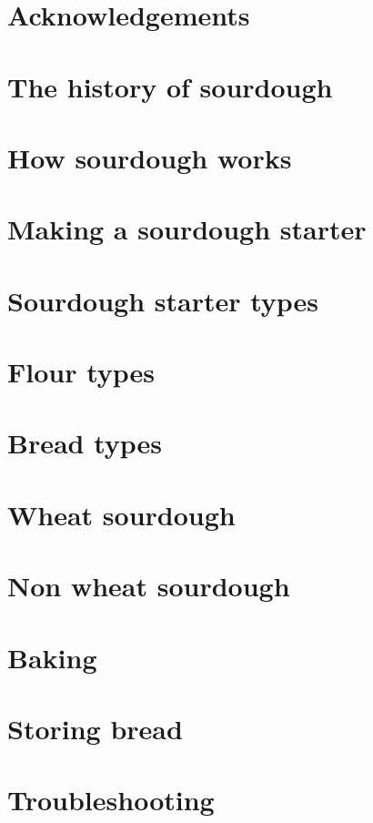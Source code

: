 \documentclass[a4paper, 12pt]{book}
\begin{document}
\chapter{Acknowledgements}



\mainmatter

\chapter{The history of sourdough}


\chapter{How sourdough works}


\chapter{Making a sourdough starter}


\chapter{Sourdough starter types}


\chapter{Flour types}


\chapter{Bread types}


\chapter{Wheat sourdough}%
\label{chapter:wheat-sourdough}


\chapter{Non wheat sourdough}%
\label{chapter:non-wheat-sourdough}


\chapter{Baking}%
\label{chapter:baking}


\chapter{Storing bread}%
\label{chapter:storing-bread}


\chapter{Troubleshooting}



\printbibliography
\end{document}
